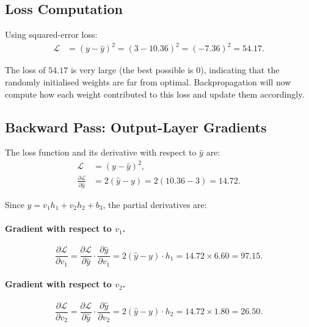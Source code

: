 \documentclass[12pt,a4paper]{article}
\newcommand{\Loss}{\mathcal{L}}
\newcommand{\yhat}{\hat{y}}
\begin{document}
\subsection{Loss Computation}
\label{subsec:loss}

Using squared-error loss:
\begin{align}
  \Loss &= (y - \yhat)^2 = (3 - 10.36)^2 = (-7.36)^2 = 54.17.
  \label{eq:loss-val}
\end{align}

The loss of $54.17$ is very large (the best possible is $0$), indicating that
the randomly initialised weights are far from optimal.  Backpropagation will
now compute how each weight contributed to this loss and update them
accordingly.

\subsection{Backward Pass: Output-Layer Gradients}
\label{subsec:backward-pass}

The loss function and its derivative with respect to $\yhat$ are:
\begin{align}
  \Loss &= (y - \yhat)^2, \\
  \frac{\partial \Loss}{\partial \yhat} &= 2(\yhat - y) = 2(10.36 - 3) = 14.72.
  \label{eq:dloss-dyhat}
\end{align}

Since $\yhat = v_1 h_1 + v_2 h_2 + b_3$, the partial derivatives are:

\paragraph{Gradient with respect to $v_1$.}
\begin{equation}
  \frac{\partial \Loss}{\partial v_1}
    = \frac{\partial \Loss}{\partial \yhat} \cdot \frac{\partial \yhat}{\partial v_1}
    = 2(\yhat - y) \cdot h_1
    = 14.72 \times 6.60 = \mathbf{97.15}.
  \label{eq:grad-v1}
\end{equation}

\paragraph{Gradient with respect to $v_2$.}
\begin{equation}
  \frac{\partial \Loss}{\partial v_2}
    = \frac{\partial \Loss}{\partial \yhat} \cdot \frac{\partial \yhat}{\partial v_2}
    = 2(\yhat - y) \cdot h_2
    = 14.72 \times 1.80 = \mathbf{26.50}.
  \label{eq:grad-v2}
\end{equation}
\end{document}
